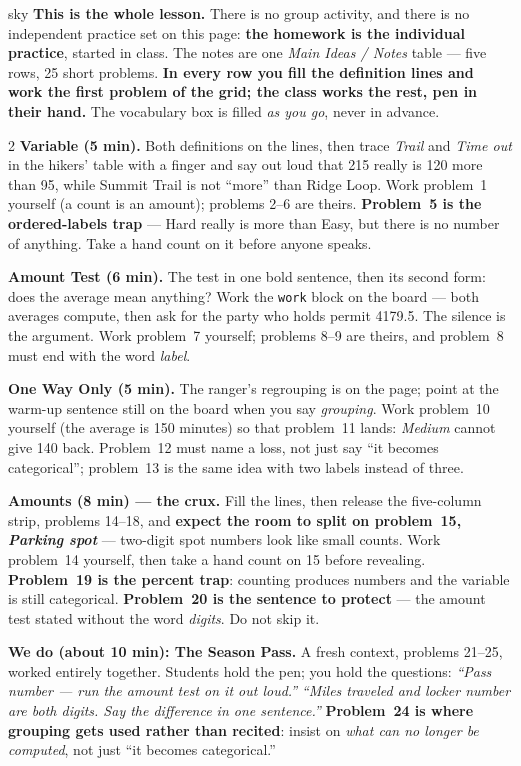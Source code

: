 \documentclass[10pt]{article}
\begin{document}
\boxguard
\begin{skillbox}{sky}
\textbf{This is the whole lesson.} There is no group activity, and there is no independent
practice set on this page: \textbf{the homework is the individual practice}, started in class.
The notes are one \emph{Main Ideas / Notes} table --- five rows, 25 short problems. \textbf{In
every row you fill the definition lines and work the first problem of the grid; the class works
the rest, pen in their hand.} The vocabulary box is filled \emph{as you go}, never in advance.
\begin{multicols}{2}
\textbf{Variable (5 min).} Both definitions on the lines, then trace \emph{Trail} and \emph{Time
out} in the hikers' table with a finger and say out loud that 215 really is 120 more than 95,
while Summit Trail is not ``more'' than Ridge Loop. Work problem~1 yourself (a count is an
amount); problems 2--6 are theirs. \textbf{Problem~5 is the ordered-labels trap} --- Hard really
is more than Easy, but there is no number of anything. Take a hand count on it before anyone
speaks.

\textbf{Amount Test (6 min).} The test in one bold sentence, then its second form: does the
average mean anything? Work the \texttt{work} block on the board --- both averages compute, then
ask for the party who holds permit 4179.5. The silence is the argument. Work problem~7 yourself;
problems 8--9 are theirs, and problem~8 must end with the word \emph{label}.

\textbf{One Way Only (5 min).} The ranger's regrouping is on the page; point at the warm-up
sentence still on the board when you say \emph{grouping}. Work problem~10 yourself (the average
is 150 minutes) so that problem~11 lands: \emph{Medium} cannot give 140 back. Problem~12 must
name a loss, not just say ``it becomes categorical''; problem~13 is the same idea with two
labels instead of three.

\textbf{Amounts (8 min) --- the crux.} Fill the lines, then release the five-column strip,
problems 14--18, and \textbf{expect the room to split on problem~15, \emph{Parking spot}} ---
two-digit spot numbers look like small counts. Work problem~14 yourself, then take a hand count
on 15 before revealing. \textbf{Problem~19 is the percent trap}: counting produces numbers and
the variable is still categorical. \textbf{Problem~20 is the sentence to protect} --- the amount
test stated without the word \emph{digits}. Do not skip it.

\columnbreak
\textbf{We do (about 10 min): The Season Pass.} A fresh context, problems 21--25, worked
entirely together. Students hold the pen; you hold the questions: \emph{``Pass number --- run
the amount test on it out loud.''} \quad \emph{``Miles traveled and locker number are both
digits. Say the difference in one sentence.''} \textbf{Problem~24 is where grouping gets used
rather than recited}: insist on \emph{what can no longer be computed}, not just ``it becomes
categorical.''


\end{multicols}
\end{skillbox}
\end{document}
